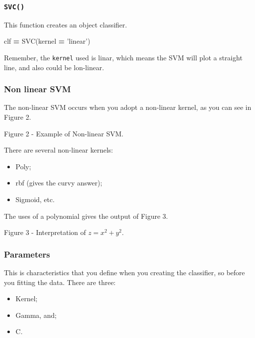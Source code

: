 \documentclass[]{book}
\newenvironment{Shaded}{\begin{snugshade}}{\end{snugshade}}
\newcommand{\StringTok}[1]{\textcolor[rgb]{0.31,0.60,0.02}{#1}}
\newcommand{\OperatorTok}[1]{\textcolor[rgb]{0.81,0.36,0.00}{\textbf{#1}}}
\newcommand{\NormalTok}[1]{#1}
\providecommand{\tightlist}{%
  \setlength{\itemsep}{0pt}\setlength{\parskip}{0pt}}
\begin{document}
\subsubsection{\texorpdfstring{\texttt{SVC()}}{SVC()}}\label{svc}

This function creates an object classifier.

\begin{Shaded}
\begin{Highlighting}[]
\NormalTok{clf }\OperatorTok{=}\NormalTok{ SVC(kernel }\OperatorTok{=} \StringTok{'linear'}\NormalTok{)}
\end{Highlighting}
\end{Shaded}

Remember, the \texttt{kernel} used is linar, which means the SVM will
plot a straight line, and also could be lon-linear.

\subsubsection{Non linear SVM}\label{non-linear-svm}

The non-linear SVM occurs when you adopt a non-linear kernel, as you can
see in Figure 2.

Figure 2 - Example of Non-linear SVM.

There are several non-linear kernels:

\begin{itemize}
\tightlist
\item
  Poly;
\item
  rbf (gives the curvy answer);
\item
  Sigmoid, etc.
\end{itemize}

The uses of a polynomial gives the output of Figure 3.

Figure 3 - Interpretation of \(z = x^2 + y^2\).

\subsubsection{Parameters}\label{parameters}

This is characteristics that you define when you creating the
classifier, so before you fitting the data. There are three:

\begin{itemize}
\tightlist
\item
  Kernel;
\item
  Gamma, and;
\item
  C.
\end{itemize}
\end{document}
